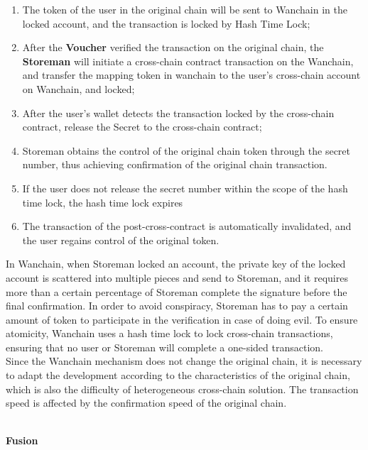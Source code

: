 \begin{enumerate}
    \item The token of the user in the original chain will be sent to Wanchain in the locked account, and the transaction is locked by Hash Time Lock;
    \item After the \textbf{Voucher} verified  the transaction on the original chain, the \textbf{Storeman} will initiate a cross-chain contract transaction on the Wanchain, and transfer the mapping token in wanchain to the user's cross-chain account on Wanchain, and locked;
    \item After the user's wallet detects the transaction locked by the cross-chain contract, release the Secret to the cross-chain contract;
    \item Storeman obtains the control of the original chain token through the secret number, thus achieving confirmation of the original chain transaction.
    \item If the user does not release the secret number within the scope of the hash time lock, the hash time lock expires
    \item The transaction of the post-cross-contract is automatically invalidated, and the user regains control of the original token.
\end{enumerate}
\noindent In Wanchain, when Storeman locked an account, the private key of the locked account is scattered into multiple pieces and send to Storeman, and it requires more than a certain percentage of Storeman complete the signature before the final confirmation. In order to avoid conspiracy, Storeman has to pay a certain amount of token to participate in the verification in case of doing evil. To ensure atomicity, Wanchain uses a hash time lock to lock cross-chain transactions, ensuring that no user or Storeman will complete a one-sided transaction.\\
\noindent Since the Wanchain mechanism does not change the original chain, it is necessary to adapt the development according to the characteristics of the original chain, which is also the difficulty of heterogeneous cross-chain solution. The transaction speed is affected by the confirmation speed of the original chain.\\\\
\begin{large}
\textbf{Fusion}
\end{large}\cite{fusion}\\


